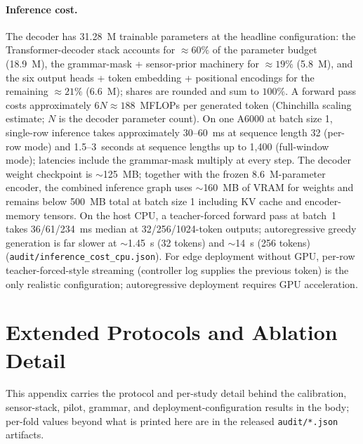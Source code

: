 \documentclass[sensors,article,submit,moreauthors,pdftex]{Definitions/mdpi}
\begin{document}
\paragraph{Inference cost.}
\label{app3:repro-inference}
The decoder has 31.28~M trainable parameters at the headline configuration: the Transformer-decoder stack
accounts for $\approx\!60\%$ of the parameter budget (18.9~M), the grammar-mask + sensor-prior machinery for
$\approx\!19\%$ (5.8~M), and the six output heads + token embedding + positional encodings for the remaining
$\approx\!21\%$ (6.6~M); shares are rounded and sum to $100\%$. A forward pass costs approximately $6N \approx
188$~MFLOPs per generated token (Chinchilla scaling estimate; $N$ is the decoder parameter count). On one
A6000 at batch size 1, single-row inference takes approximately 30--60~ms at sequence length 32 (per-row mode)
and 1.5--3~seconds at sequence lengths up to 1{,}400 (full-window mode); latencies include the grammar-mask
multiply at every step. The decoder weight checkpoint is $\sim$125~MB; together with the frozen
8.6~M-parameter encoder, the combined inference graph uses $\sim$160~MB of VRAM for weights and remains below
500~MB total at batch size 1 including KV cache and encoder-memory tensors. On the host CPU, a teacher-forced forward pass at batch~1 takes 36/61/234~ms median at 32/256/1024-token outputs; autoregressive greedy generation is far slower at $\sim$1.45~s (32 tokens) and $\sim$14~s (256 tokens) (\texttt{audit/\allowbreak inference\_cost\_cpu.json}). For edge deployment without GPU, per-row teacher-forced-style streaming (controller log supplies the previous token) is the only realistic configuration; autoregressive deployment requires GPU acceleration.

\section{Extended Protocols and Ablation Detail}
\label{app3:protocol}

This appendix carries the protocol and per-study detail behind the calibration, sensor-stack, pilot, grammar, and deployment-configuration results in the body; per-fold values beyond what is printed here are in the released \texttt{audit/*.json} artifacts.
\end{document}
